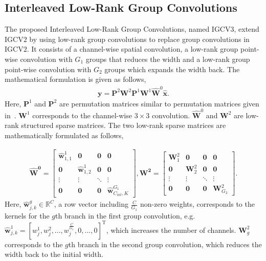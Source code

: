 \documentclass{bmvc2k}
\begin{document}
	\subsection{Interleaved Low-Rank Group Convolutions}
	The proposed Interleaved Low-Rank Group Convolutions,
	named IGCV$3$, extend IGCV$2$
	by using low-rank group convolutions
	to replace group convolutions in IGCV$2$.
	It consists of a channel-wise spatial convolution,
	a low-rank group point-wise convolution with $G_1$ groups
	that reduces the width
	and a low-rank group point-wise convolution with $G_2$ groups
	which expands the width back.
	The mathematical formulation is given as follows,
	\begin{align}
	\mathbf{y} = \mathbf{P}^2\mathbf{W}^2\mathbf{P}^1\mathbf{W}^1\mathbf{\hat{W}}^0 \mathbf{\hat{x}}.
	\label{eqn:igcv3}
	\end{align}
	Here, $\mathbf{P}^1$ and $\mathbf{P}^2$ are permutation matrices
	similar to permutation matrices given in~\cite{zhang2017interleaved}.
	$\mathbf{W}^1$ corresponds to the channel-wise $3\times 3$ convolution.
	$\mathbf{\hat{W}}^0$ and $\mathbf{W}^2$ are low-rank structured sparse matrices. The two low-rank sparse matrices are mathematically formulated as follows,
	
	
	\begin{align}
	\mathbf{\hat{W}^0} =  \begin{bmatrix}
	\mathbf{\hat{w}}_{1,1}^{1} & \boldsymbol{0} &  \boldsymbol{0} &  \boldsymbol{0}
	\\[0.3em]
	\boldsymbol{0} & \mathbf{\hat{w}}_{1,2}^{1}  & \boldsymbol{0} & \boldsymbol{0} \\[0.3em]
	\vdots  & \vdots & \ddots  & \vdots \\[0.3em]
	\boldsymbol{0} & \boldsymbol{0} & \boldsymbol{0}& \mathbf{\hat{w}}_{C_{int},K}^{G_1}
	\end{bmatrix},
	\mathbf{{W}^2} =  \begin{bmatrix}
	\mathbf{{W}}_{1}^{2} & \boldsymbol{0} &  \boldsymbol{0} &  \boldsymbol{0}
	\\[0.3em]
	\boldsymbol{0} & \mathbf{{W}}_{2}^{2}  & \boldsymbol{0} & \boldsymbol{0} \\[0.3em]
	\vdots & \vdots & \ddots  & \vdots \\[0.3em]
	\boldsymbol{0} & \boldsymbol{0} & \boldsymbol{0} & \mathbf{{W}}_{G_2}^{2}
	\end{bmatrix}.
	\label{eqn:migcv3}
	\end{align}
	Here, $\mathbf{\hat{w}}^g_{j,k} \in \mathbb{R}^{C}$, a row vector including $\frac{C}{G_1}$ non-zero weights, corresponds to the kernels for the $g$th branch in the first group convolution, e.g. $\mathbf{\hat{w}}^1_{j,k} = [w_j^1,w_j^2,...,w_j^{\frac{C}{G_1}},0,...,0]^\mathrm{T}$, which increases the number of channels. $\mathbf{{W}}_{g}^{2}$ corresponds to the $g$th branch in the second group convolution, which reduces the width back to the initial width.
	
\end{document}
